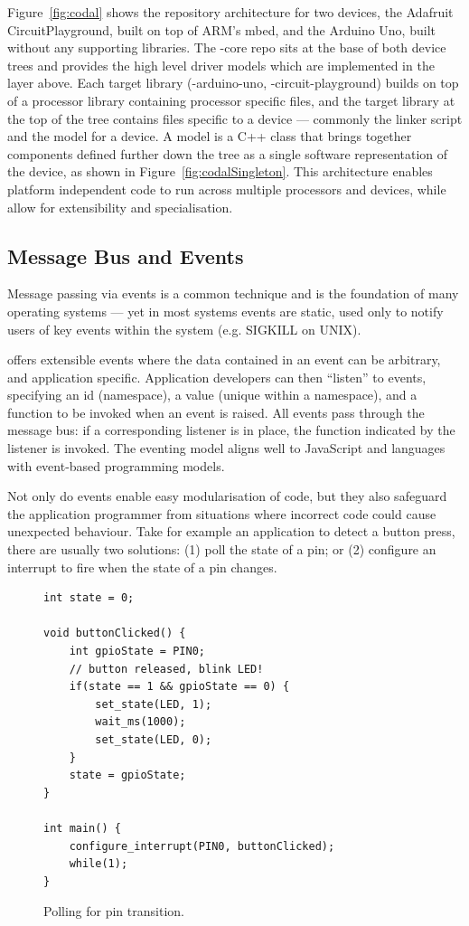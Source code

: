 Figure~\ref{fig:codal} shows the repository architecture for two \CO devices, the Adafruit CircuitPlayground, built on top of ARM's mbed, and the Arduino Uno, built without any supporting libraries. The \COLN-core repo sits at the base of both device trees and provides the high level driver models which are implemented in the layer above. Each target library (\COLN-arduino-uno, \COLN-circuit-playground) builds on top of a processor library containing processor specific files, and the target library at the top of the tree contains files specific to a device --- commonly the linker script and the model for a device. A model is a C++ class that brings together components defined further down the tree as a single software representation of the device,
as shown in Figure~\ref{fig:codalSingleton}. 
This architecture enables platform independent code to run across multiple processors and devices, while allow for extensibility and specialisation.

\subsection{Message Bus and Events}

Message passing via events is a common technique and is the foundation of many operating systems --- yet in most systems events are static, used only to notify users of key events within the system (e.g. SIGKILL on UNIX).

    
\CO offers extensible events where the data contained in an event can be arbitrary, and application specific. Application developers can then ``listen'' to events, specifying an id (namespace), a value (unique within a namespace), and a function to be invoked when an event is raised. All events pass through the message bus: if a corresponding listener is in place, the function indicated by the listener is invoked. The eventing model aligns well to JavaScript and languages with event-based programming models. 

Not only do events enable easy modularisation of code, but they also safeguard the application programmer from situations where incorrect code could cause unexpected behaviour. Take for example an application to detect a button press, there are usually two solutions: (1) poll the state of a pin; or (2) configure an interrupt to fire when the state of a pin changes. 

\begin{figure}
\begin{lstlisting}
int state = 0;

void buttonClicked() {
    int gpioState = PIN0;
    // button released, blink LED!
    if(state == 1 && gpioState == 0) {
        set_state(LED, 1);
        wait_ms(1000);
        set_state(LED, 0);
    }
    state = gpioState;
}

int main() {
    configure_interrupt(PIN0, buttonClicked);
    while(1);
}
\end{lstlisting}
\caption{\label{fig:pollPin}Polling for pin transition.}
\end{figure}
    

